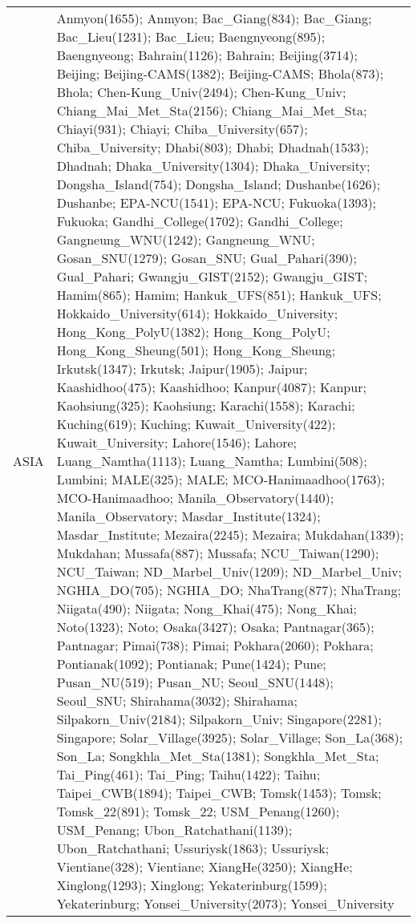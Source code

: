 \documentclass[journal abbreviation, manuscript]{copernicus}
\begin{document}
\begin{table}
\begin{tabularx}{\textwidth}{lX}
                                                                                                                                                                                                                                                                                                                                                                                                                                      \\
  ASIA      & Anmyon(1655); Anmyon; Bac\_Giang(834); Bac\_Giang; Bac\_Lieu(1231); Bac\_Lieu; Baengnyeong(895); Baengnyeong; Bahrain(1126); Bahrain; Beijing(3714); Beijing; Beijing-CAMS(1382); Beijing-CAMS; Bhola(873); Bhola; Chen-Kung\_Univ(2494); Chen-Kung\_Univ; Chiang\_Mai\_Met\_Sta(2156); Chiang\_Mai\_Met\_Sta; Chiayi(931); Chiayi; Chiba\_University(657); Chiba\_University; Dhabi(803); Dhabi; Dhadnah(1533); Dhadnah; Dhaka\_University(1304); Dhaka\_University; Dongsha\_Island(754); Dongsha\_Island; Dushanbe(1626); Dushanbe; EPA-NCU(1541); EPA-NCU; Fukuoka(1393); Fukuoka; Gandhi\_College(1702); Gandhi\_College; Gangneung\_WNU(1242); Gangneung\_WNU; Gosan\_SNU(1279); Gosan\_SNU; Gual\_Pahari(390); Gual\_Pahari; Gwangju\_GIST(2152); Gwangju\_GIST; Hamim(865); Hamim; Hankuk\_UFS(851); Hankuk\_UFS; Hokkaido\_University(614); Hokkaido\_University; Hong\_Kong\_PolyU(1382); Hong\_Kong\_PolyU; Hong\_Kong\_Sheung(501); Hong\_Kong\_Sheung; Irkutsk(1347); Irkutsk; Jaipur(1905); Jaipur; Kaashidhoo(475); Kaashidhoo; Kanpur(4087); Kanpur; Kaohsiung(325); Kaohsiung; Karachi(1558); Karachi; Kuching(619); Kuching; Kuwait\_University(422); Kuwait\_University; Lahore(1546); Lahore; Luang\_Namtha(1113); Luang\_Namtha; Lumbini(508); Lumbini; MALE(325); MALE; MCO-Hanimaadhoo(1763); MCO-Hanimaadhoo; Manila\_Observatory(1440); Manila\_Observatory; Masdar\_Institute(1324); Masdar\_Institute; Mezaira(2245); Mezaira; Mukdahan(1339); Mukdahan; Mussafa(887); Mussafa; NCU\_Taiwan(1290); NCU\_Taiwan; ND\_Marbel\_Univ(1209); ND\_Marbel\_Univ; NGHIA\_DO(705); NGHIA\_DO; NhaTrang(877); NhaTrang; Niigata(490); Niigata; Nong\_Khai(475); Nong\_Khai; Noto(1323); Noto; Osaka(3427); Osaka; Pantnagar(365); Pantnagar; Pimai(738); Pimai; Pokhara(2060); Pokhara; Pontianak(1092); Pontianak; Pune(1424); Pune; Pusan\_NU(519); Pusan\_NU; Seoul\_SNU(1448); Seoul\_SNU; Shirahama(3032); Shirahama; Silpakorn\_Univ(2184); Silpakorn\_Univ; Singapore(2281); Singapore; Solar\_Village(3925); Solar\_Village; Son\_La(368); Son\_La; Songkhla\_Met\_Sta(1381); Songkhla\_Met\_Sta; Tai\_Ping(461); Tai\_Ping; Taihu(1422); Taihu; Taipei\_CWB(1894); Taipei\_CWB; Tomsk(1453); Tomsk; Tomsk\_22(891); Tomsk\_22; USM\_Penang(1260); USM\_Penang; Ubon\_Ratchathani(1139); Ubon\_Ratchathani; Ussuriysk(1863); Ussuriysk; Vientiane(328); Vientiane; XiangHe(3250); XiangHe; Xinglong(1293); Xinglong; Yekaterinburg(1599); Yekaterinburg; Yonsei\_University(2073); Yonsei\_University                                                                                                                                                                                                                                                                                                                                                                    
\end{tabularx}
\end{table}
\end{document}
